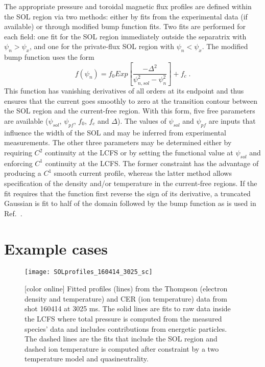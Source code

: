 \documentclass[english,aps,superscriptaddress,showkeys,showpacs,prepri,twocolumn]{revtex4}
\begin{document}
The appropriate pressure and toroidal magnetic flux profiles are defined within
the SOL region via two methods: either by fits from the experimental data (if
available) or through modified bump function fits. Two fits are performed
for each field: one fit for the SOL region immediately outside the separatrix with
$\psi_n>\psi_x$, and one for the private-flux SOL region with $\psi_n<\psi_x$.
The modified bump function uses the form
\begin{equation}
f\left(\psi_n\right)=f_0 Exp\left[\frac{-\Delta^2}{\psi^2_{n,sol} - \psi^2_n} \right]+f_c\;.
\label{bumpftn}
\end{equation}
This function has vanishing derivatives of all orders at its endpoint and thus
ensures that the current goes smoothly to zero at the transition contour
between the SOL region and the current-free region.  With this form, five free
parameters are available ($\psi_{sol}$, $\psi_{pf}$, $f_0$, $f_c$ and
$\Delta$). The values of $\psi_{sol}$ and $\psi_{pf}$ are inputs
that influence the width of the SOL and may be inferred from
experimental measurements. The other
three parameters may be determined either by requiring $C^2$ continuity at the
LCFS or by setting the functional value at $\psi_{sol}$ and enforcing $C^1$
continuity at the LCFS.  The former constraint has the advantage of producing a
$C^1$ smooth current profile, whereas the latter method allows specification of
the density and/or temperature in the current-free regions.  If the fit
requires that the function first reverse the sign of its derivative, a truncated Gaussian
is fit to half of the domain followed by the bump function as is used in
Ref.~\cite{Groebner_JRT}.

\section{Example cases}
\label{sec:examples}

\begin{figure}
\begin{center}
\texttt{[image: SOLprofiles\_160414\_3025\_sc]}
\caption{ [color online]
Fitted profiles (lines) from the Thompson (electron density and temperature)
and CER (ion temperature) data from shot 160414 at 3025 ms. The solid lines are
fits to raw data inside the LCFS where total pressure is computed from the
measured species' data and includes contributions from energetic particles.
The dashed lines are the fits that include the SOL region and dashed ion
temperature is computed after constraint by a two temperature model and
quasineutrality.
}
\label{prof160414}
\end{center}
\end{figure}
\end{document}
